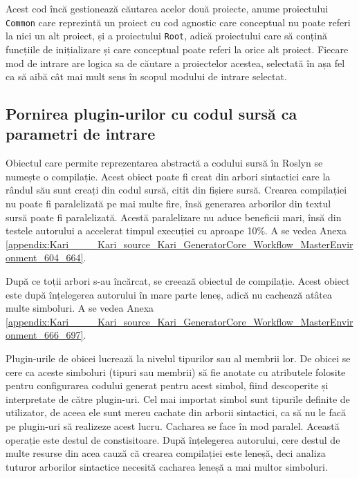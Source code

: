 \documentclass[a4paper,12pt]{report}
\begin{document}
Acest cod încă gestionează căutarea acelor două proiecte, anume proiectului \texttt{Common} care reprezintă un proiect cu cod agnostic care conceptual nu poate referi la nici un alt proiect, și a proiectului \texttt{Root}, adică proiectului care să conțină funcțiile de inițializare și care conceptual poate referi la orice alt proiect.
Fiecare mod de intrare are logica sa de căutare a proiectelor acestea, selectată în așa fel ca să aibă cât mai mult sens în scopul modului de intrare selectat.

\subsection{Pornirea plugin-urilor cu codul sursă ca parametri de intrare}

Obiectul care permite reprezentarea abstractă a codului sursă în Roslyn se numește o compilație.
Acest obiect poate fi creat din arbori sintactici care la rândul său sunt creați din codul sursă, citit din fișiere sursă.
Crearea compilației nu poate fi paralelizată pe mai multe fire, însă generarea arborilor din textul sursă poate fi paralelizată.
Acestă paralelizare nu aduce beneficii mari, însă din testele autorului a accelerat timpul execuției cu aproape 10\%.
A se vedea Anexa \ref{appendix:Kari____Kari_source_Kari_GeneratorCore_Workflow_MasterEnvironment_604_664}.

După ce toții arbori s-au încărcat, se creează obiectul de compilație.
Acest obiect este după înțelegerea autorului în mare parte leneș, adică nu cachează atâtea multe simboluri.
A se vedea Anexa \ref{appendix:Kari____Kari_source_Kari_GeneratorCore_Workflow_MasterEnvironment_666_697}.

Plugin-urile de obicei lucrează la nivelul tipurilor sau al membrii lor.
De obicei se cere ca aceste simboluri (tipuri sau membrii) să fie anotate cu atributele folosite pentru configurarea codului generat pentru acest simbol, fiind descoperite și interpretate de către plugin-uri.
Cel mai importat simbol sunt tipurile definite de utilizator, de aceea ele sunt mereu cachate din arborii sintactici, ca să nu le facă pe plugin-uri să realizeze acest lucru.
Cacharea se face în mod paralel.
Această operație este destul de constisitoare.
După înțelegerea autorului, cere destul de multe resurse din acea cauză că crearea compilației este leneșă, deci analiza tuturor arborilor sintactice necesită cacharea leneșă a mai multor simboluri.
\inputminted[firstline=699, lastline=727]{cs}{../Kari/source/Kari.GeneratorCore/Workflow/MasterEnvironment.cs}
\end{document}
